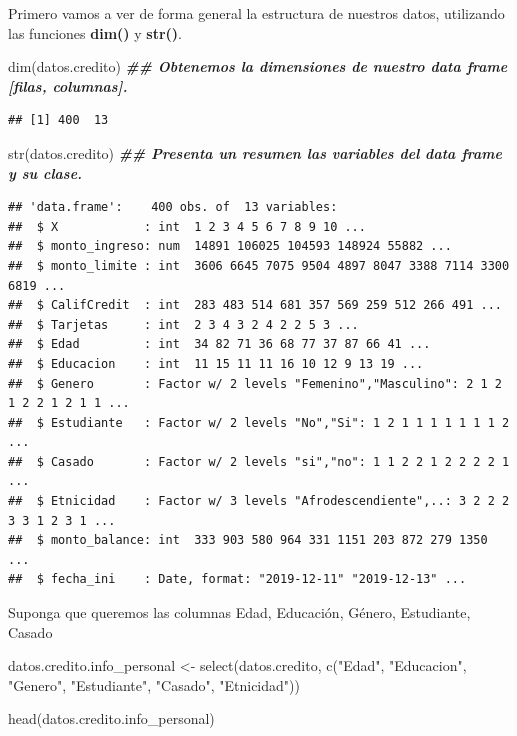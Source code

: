 \documentclass[
  12pt,
]{book}
\newenvironment{Shaded}{\begin{snugshade}}{\end{snugshade}}
\newcommand{\DocumentationTok}[1]{\textcolor[rgb]{0.56,0.35,0.01}{\textbf{\textit{#1}}}}
\newcommand{\FunctionTok}[1]{\textcolor[rgb]{0.00,0.00,0.00}{#1}}
\newcommand{\NormalTok}[1]{#1}
\newcommand{\OtherTok}[1]{\textcolor[rgb]{0.56,0.35,0.01}{#1}}
\newcommand{\StringTok}[1]{\textcolor[rgb]{0.31,0.60,0.02}{#1}}
\begin{document}
Primero vamos a ver de forma general la estructura de nuestros datos, utilizando las funciones \textbf{dim()
} y \textbf{str()}.

\begin{Shaded}
\begin{Highlighting}[]
\FunctionTok{dim}\NormalTok{(datos.credito) }\DocumentationTok{\#\# Obtenemos la dimensiones de nuestro data frame [filas, columnas].}
\end{Highlighting}
\end{Shaded}

\begin{verbatim}
## [1] 400  13
\end{verbatim}

\begin{Shaded}
\begin{Highlighting}[]
\FunctionTok{str}\NormalTok{(datos.credito) }\DocumentationTok{\#\# Presenta un resumen las variables del data frame y su clase.}
\end{Highlighting}
\end{Shaded}

\begin{verbatim}
## 'data.frame':    400 obs. of  13 variables:
##  $ X            : int  1 2 3 4 5 6 7 8 9 10 ...
##  $ monto_ingreso: num  14891 106025 104593 148924 55882 ...
##  $ monto_limite : int  3606 6645 7075 9504 4897 8047 3388 7114 3300 6819 ...
##  $ CalifCredit  : int  283 483 514 681 357 569 259 512 266 491 ...
##  $ Tarjetas     : int  2 3 4 3 2 4 2 2 5 3 ...
##  $ Edad         : int  34 82 71 36 68 77 37 87 66 41 ...
##  $ Educacion    : int  11 15 11 11 16 10 12 9 13 19 ...
##  $ Genero       : Factor w/ 2 levels "Femenino","Masculino": 2 1 2 1 2 2 1 2 1 1 ...
##  $ Estudiante   : Factor w/ 2 levels "No","Si": 1 2 1 1 1 1 1 1 1 2 ...
##  $ Casado       : Factor w/ 2 levels "si","no": 1 1 2 2 1 2 2 2 2 1 ...
##  $ Etnicidad    : Factor w/ 3 levels "Afrodescendiente",..: 3 2 2 2 3 3 1 2 3 1 ...
##  $ monto_balance: int  333 903 580 964 331 1151 203 872 279 1350 ...
##  $ fecha_ini    : Date, format: "2019-12-11" "2019-12-13" ...
\end{verbatim}

Suponga que queremos las columnas Edad, Educación, Género, Estudiante, Casado

\begin{Shaded}
\begin{Highlighting}[]
\NormalTok{datos.credito.info\_personal }\OtherTok{\textless{}{-}} \FunctionTok{select}\NormalTok{(datos.credito, }\FunctionTok{c}\NormalTok{(}\StringTok{"Edad"}\NormalTok{, }\StringTok{"Educacion"}\NormalTok{, }\StringTok{"Genero"}\NormalTok{, }\StringTok{"Estudiante"}\NormalTok{, }\StringTok{"Casado"}\NormalTok{, }\StringTok{"Etnicidad"}\NormalTok{))}

\FunctionTok{head}\NormalTok{(datos.credito.info\_personal)}
\end{Highlighting}
\end{Shaded}
\end{document}
